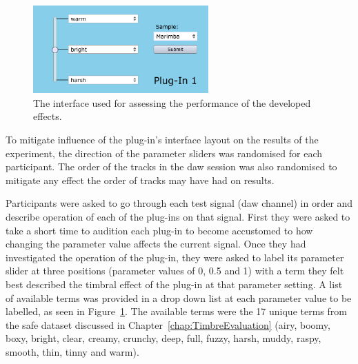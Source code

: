 			\begin{figure}[h!]
				\centering
				\includegraphics[width=0.6\textwidth]{chapter7/Images/TestPlugInInterface.png}
				\caption{The interface used for assessing the performance of the developed effects.}
				\label{fig:TestPlugInterface}
			\end{figure}

			To mitigate influence of the plug-in's interface layout on the results of the experiment, the
			direction of the parameter sliders was randomised for each participant. The order of the tracks in
			the \acrshort{daw} session was also randomised to mitigate any effect the order of tracks may have
			had on results.

			Participants were asked to go through each test signal (\acrshort{daw} channel) in order and
			describe operation of each of the plug-ins on that signal. First they were asked to take a short
			time to audition each plug-in to become accustomed to how changing the parameter value affects the
			current signal. Once they had investigated the operation of the plug-in, they were asked to label
			its parameter slider at three positions (parameter values of 0, 0.5 and 1) with a term they felt
			best described the timbral effect of the plug-in at that parameter setting. A list of available
			terms was provided in a drop down list at each parameter value to be labelled, as seen in
			Figure~\ref{fig:TestPlugInterface}. The available terms were the 17 unique terms from the
			\acrshort{safe} dataset discussed in Chapter~\ref{chap:TimbreEvaluation} (airy, boomy, boxy,
			bright, clear, creamy, crunchy, deep, full, fuzzy, harsh, muddy, raspy, smooth, thin, tinny and
			warm).

